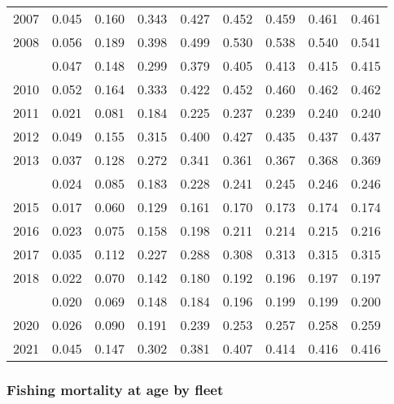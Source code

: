 \documentclass[
]{article}
\begin{document}
\begin{longtable}[t]{lrrrrrrrr}
2007 & 0.045 & 0.160 & 0.343 & 0.427 & 0.452 & 0.459 & 0.461 & 0.461\\
2008 & 0.056 & 0.189 & 0.398 & 0.499 & 0.530 & 0.538 & 0.540 & 0.541\\
\addlinespace
2009 & 0.047 & 0.148 & 0.299 & 0.379 & 0.405 & 0.413 & 0.415 & 0.415\\
2010 & 0.052 & 0.164 & 0.333 & 0.422 & 0.452 & 0.460 & 0.462 & 0.462\\
2011 & 0.021 & 0.081 & 0.184 & 0.225 & 0.237 & 0.239 & 0.240 & 0.240\\
2012 & 0.049 & 0.155 & 0.315 & 0.400 & 0.427 & 0.435 & 0.437 & 0.437\\
2013 & 0.037 & 0.128 & 0.272 & 0.341 & 0.361 & 0.367 & 0.368 & 0.369\\
\addlinespace
2014 & 0.024 & 0.085 & 0.183 & 0.228 & 0.241 & 0.245 & 0.246 & 0.246\\
2015 & 0.017 & 0.060 & 0.129 & 0.161 & 0.170 & 0.173 & 0.174 & 0.174\\
2016 & 0.023 & 0.075 & 0.158 & 0.198 & 0.211 & 0.214 & 0.215 & 0.216\\
2017 & 0.035 & 0.112 & 0.227 & 0.288 & 0.308 & 0.313 & 0.315 & 0.315\\
2018 & 0.022 & 0.070 & 0.142 & 0.180 & 0.192 & 0.196 & 0.197 & 0.197\\
\addlinespace
2019 & 0.020 & 0.069 & 0.148 & 0.184 & 0.196 & 0.199 & 0.199 & 0.200\\
2020 & 0.026 & 0.090 & 0.191 & 0.239 & 0.253 & 0.257 & 0.258 & 0.259\\
2021 & 0.045 & 0.147 & 0.302 & 0.381 & 0.407 & 0.414 & 0.416 & 0.416\\*
\end{longtable}

\hypertarget{fishing-mortality-at-age-by-fleet}{%
\subsubsection{Fishing mortality at age by
fleet}\label{fishing-mortality-at-age-by-fleet}}
\end{document}
